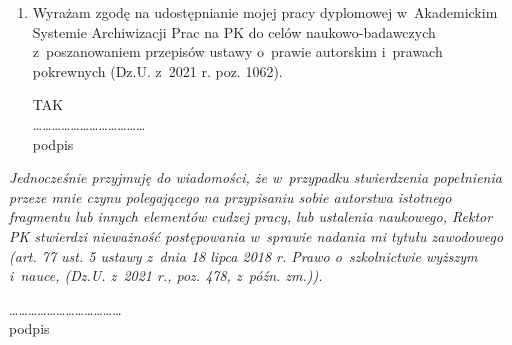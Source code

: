 \begin{small}
\begin{enumerate}
          \item Wyrażam zgodę na udostępnianie mojej pracy dyplomowej w~Akademickim Systemie Archiwizacji Prac na PK do celów naukowo-badawczych z~poszanowaniem przepisów ustawy o~prawie autorskim i~prawach pokrewnych (Dz.U. z~2021 r. poz. 1062).

                \begin{flushright}
                     TAK \\
                     \vspace{2\baselineskip}
                     ………………………………\\
                     podpis
                \end{flushright}

     \end{enumerate}
     \textit{Jednocześnie przyjmuję do wiadomości, że w~przypadku stwierdzenia popełnienia przeze mnie czynu polegającego na przypisaniu sobie autorstwa istotnego fragmentu lub innych elementów cudzej pracy, lub ustalenia naukowego, Rektor PK stwierdzi nieważność postępowania w~sprawie nadania mi tytułu zawodowego (art. 77 ust. 5 ustawy z~dnia 18 lipca 2018 r. Prawo o~szkolnictwie wyższym i~nauce, (Dz.U. z~2021 r., poz. 478, z~późn. zm.)).}

     \begin{flushright}
          \vspace{2\baselineskip}
          ……………………………… \\
          podpis
     \end{flushright}
\end{small}

\endgroup

\afterpage{\blankpage}

